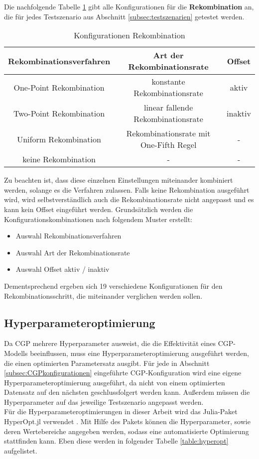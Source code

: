 Die nachfolgende Tabelle \ref{table:Rekombinationskonfigurationen} gibt alle Konfigurationen für die \textbf{Rekombination} an, die für jedes Testszenario aus Abschnitt \ref{subsec:testszenarien} getestet werden.

\begin{table}[h]
	\centering
	\begin{tabular}{c | c | c}
		\textbf{Rekombinationsverfahren} & \textbf{Art der Rekombinationsrate} & \textbf{Offset}\\
		\hline
		One-Point Rekombination & konstante Rekombinationsrate  & aktiv \\
		\hline
		Two-Point Rekombination & linear fallende Rekombinationsrate & inaktiv \\
		\hline
		Uniform Rekombination & Rekombinationsrate mit One-Fifth Regel & - \\
		\hline
		keine Rekombination &  - &  - \\
	\end{tabular}
	\caption{Konfigurationen Rekombination}
	\label{table:Rekombinationskonfigurationen}
\end{table}

Zu beachten ist, dass diese einzelnen Einstellungen miteinander kombiniert werden, solange es die Verfahren zulassen.
Falls keine Rekombination ausgeführt wird, wird selbstverständlich auch die Rekombinationsrate nicht angepasst und es kann kein Offset eingeführt werden.
Grundsätzlich werden die Konfigurationskombinationen nach folgendem Muster erstellt:
\begin{itemize}
	\item Auswahl Rekombinationsverfahren
	\item Auswahl Art der Rekombinationsrate
	\item Auswahl Offset aktiv / inaktiv
\end{itemize}

Dementsprechend ergeben sich 19 verschiedene Konfigurationen für den Rekombinationsschritt, die miteinander verglichen werden sollen. 


\subsection{Hyperparameteroptimierung}
\label{subsec:hpo}

Da CGP mehrere Hyperparameter ausweist, die die Effektivität eines CGP-Modells beeinflussen, muss eine Hyperparameteroptimierung ausgeführt werden, die einen optimierten Parametersatz ausgibt.
Für jede in Abschnitt \ref{subsec:CGPkonfigurationen} eingeführte CGP-Konfiguration wird eine eigene Hyperparameteroptimierung ausgeführt, da nicht von einem optimierten Datensatz auf den nächsten geschlussfolgert werden kann.
Außerdem müssen die Hyperparameter auf das jeweilige Testszenario angepasst werden.\\
Für die Hyperparameteroptimierungen in dieser Arbeit wird das Julia-Paket HyperOpt.jl verwendet \cite{carlson_baggepinnenhyperoptjl_2025}.
Mit Hilfe des Pakets können die Hyperparameter, sowie deren Wertebereiche angegeben werden, sodass eine automatisierte Optimierung stattfinden kann.
Eben diese werden in folgender Tabelle \ref{table:hyperopt} aufgelistet.

